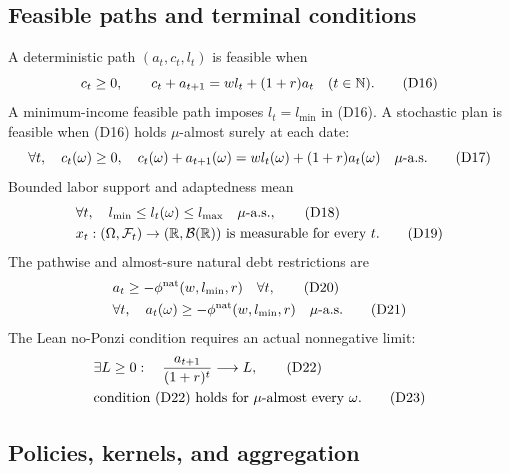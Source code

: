 \documentclass[11pt]{article}
\newcommand{\R}{\mathbb R}
\newcommand{\N}{\mathbb N}
\newcommand{\eqD}[1]{\refstepcounter{equation}\tag{D#1}}
\begin{document}
\subsection{Feasible paths and terminal conditions}

A deterministic path \((a_t,c_t,l_t)\) is feasible when
\begin{equation}
 c_t\ge0,\qquad c_t+a_{t+1}=wl_t+(1+r)a_t\quad(t\in\N). \eqD{16}\label{D16}
\end{equation}
A minimum-income feasible path imposes \(l_t=l_{\min}\) in (D16).  A stochastic
plan is feasible when (D16) holds \(\mu\)-almost surely at each date:
\begin{equation}
 \forall t,\quad c_t(\omega)\ge0,\quad
 c_t(\omega)+a_{t+1}(\omega)=wl_t(\omega)+(1+r)a_t(\omega)\quad\mu\text{-a.s.}
 \eqD{17}\label{D17}
\end{equation}
Bounded labor support and adaptedness mean
\begin{align}
 &\forall t,\quad l_{\min}\le l_t(\omega)\le l_{\max}\quad\mu\text{-a.s.},
 \eqD{18}\label{D18}\\
 &x_t:(\Omega,\mathcal F_t)\to(\R,\mathcal B(\R))\text{ is measurable for every }t.
 \eqD{19}\label{D19}
\end{align}
The pathwise and almost-sure natural debt restrictions are
\begin{align}
 &a_t\ge-\phi^{\rm nat}(w,l_{\min},r)\quad\forall t, \eqD{20}\label{D20}\\
 &\forall t,\quad a_t(\omega)\ge-\phi^{\rm nat}(w,l_{\min},r)\quad\mu\text{-a.s.}
 \eqD{21}\label{D21}
\end{align}
The Lean no-Ponzi condition requires an actual nonnegative limit:
\begin{align}
 &\exists L\ge0:\quad \frac{a_{t+1}}{(1+r)^t}\longrightarrow L, \eqD{22}\label{D22}\\
 &\text{condition (D22) holds for }\mu\text{-almost every }\omega. \eqD{23}\label{D23}
\end{align}

\subsection{Policies, kernels, and aggregation}
\end{document}
